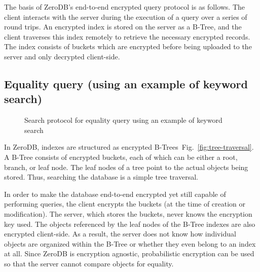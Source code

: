 \documentclass[notitlepage,longbibliography]{revtex4-1}
\newcommand{\figref}[1]{Fig.~\ref{#1}}
\begin{document}
The basis of ZeroDB's end-to-end encrypted query protocol is as follows.
The client interacts with the server during the execution of a query over a series of round trips.
An encrypted index is stored on the server as a B-Tree, and the client traverses this index remotely to retrieve the necessary encrypted records.
The index consists of buckets which are encrypted before being uploaded to the server and only decrypted client-side.

\subsection{Equality query (using an example of keyword search)}
\begin{figure}
	\begin{center}
        \qquad
	\end{center}
    \caption{Search protocol for equality query using an example of keyword search}
	\label{fig:btree-protocol}
\end{figure}

In ZeroDB, indexes are structured as encrypted B-Trees~\figref{fig:tree-traversal}.
A B-Tree consists of encrypted buckets, each of which can be either a root, branch, or leaf node.
The leaf nodes of a tree point to the actual objects being stored.
Thus, searching the database is a simple tree traversal.

In order to make the database end-to-end encrypted yet still capable of performing queries, the client encrypts the buckets (at the time of creation or modification).
The server, which stores the buckets, never knows the encryption key used.
The objects referenced by the leaf nodes of the B-Tree indexes are also encrypted client-side.
As a result, the server does not know how individual objects are organized within the B-Tree or whether they even belong to an index at all.
Since ZeroDB is encryption agnostic, probabilistic encryption can be used so that the server cannot compare objects for equality.
\end{document}
